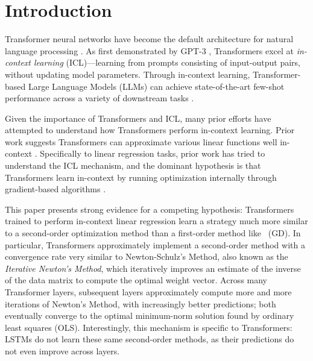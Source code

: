 \section{Introduction} \label{sec:intro}
\vspace{-1mm}

Transformer neural networks \citep{Vaswani2017AttentionIA} have become the default architecture for natural language processing \citep{devlin-etal-2019-bert,brown2020lm,openai2023gpt}.
    As first demonstrated by GPT-3 \citep{brown2020lm}, Transformers excel at \textit{in-context learning} (ICL)---learning from prompts consisting of input-output pairs, without updating model parameters. 
Through in-context learning, Transformer-based Large Language Models (LLMs) can achieve state-of-the-art few-shot performance across a variety of downstream tasks \citep{rae2022scaling,smith2022using,thoppilan2022lamda,chowdhery2022palm}.





Given the importance of Transformers and ICL, many prior efforts have attempted to understand how Transformers perform in-context learning.
Prior work suggests Transformers can approximate various linear functions well in-context \citep{Garg2022WhatCT}.
Specifically to linear regression tasks, prior work has tried to understand the ICL mechanism, and the dominant hypothesis is that Transformers learn in-context by running optimization internally through gradient-based algorithms \citep{Oswald2022TransformersLI,Oswald2023UncoveringMA,Ahn2023TransformersLT,Dai2023WhyCG,mahankali2024one}. %

This paper presents strong evidence for a competing hypothesis:
Transformers trained to perform in-context linear regression learn a strategy much more similar to a second-order optimization method than a first-order method like \gd\ (GD). 
In particular, Transformers approximately implement a second-order method with a convergence rate very similar to Newton-Schulz's Method, also known as the \textit{Iterative Newton's Method}, which iteratively improves an estimate of the inverse of the data matrix to compute the optimal weight vector.
Across many Transformer layers, subsequent layers approximately compute more and more iterations of Newton's Method, with increasingly better predictions; both eventually converge to the optimal minimum-norm solution found by ordinary least squares (OLS). 
Interestingly, this mechanism is specific to Transformers: LSTMs do not learn these same second-order methods, as their predictions do not even improve across layers.


